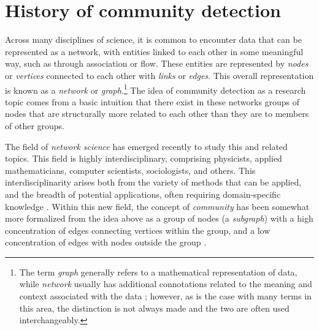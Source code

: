 \hypertarget{history}{\section{History of community
detection}\label{history}}

Across many disciplines of science, it is common to encounter data that
can be represented as a network, with entities linked to each other in
some meaningful way, such as through association or flow. These entities
are represented by \emph{nodes} or \emph{vertices} connected to each
other with \emph{links} or \emph{edges}. This overall representation is
known as a \emph{network} or \emph{graph}.\footnote{The term
  \emph{graph} generally refers to a mathematical representation of
  data, while \emph{network} usually has additional connotations related
  to the meaning and context associated with the data
  \autocite{porter_communities_2009}; however, as is the case with many
  terms in this area, the distinction is not always made and the two are
  often used interchangeably.} The idea of community detection as a
research topic comes from a basic intuition that there exist in these
networks groups of nodes that are structurally more related to each
other than they are to members of other groups.

The field of \emph{network science} has emerged recently to study this
and related topics. This field is highly interdisciplinary, comprising
physicists, applied mathematicians, computer scientists, sociologists,
and others. This interdisciplinarity arises both from the variety of
methods that can be applied, and the breadth of potential applications,
often requiring domain-specific knowledge
\autocite{porter_communities_2009}. Within this new field, the concept
of \emph{community} has been somewhat more formalized from the idea
above as a group of nodes (a \emph{subgraph}) with a high concentration
of edges connecting vertices within the group, and a low concentration
of edges with nodes outside the group
\autocite{fortunato_community_2010}.

